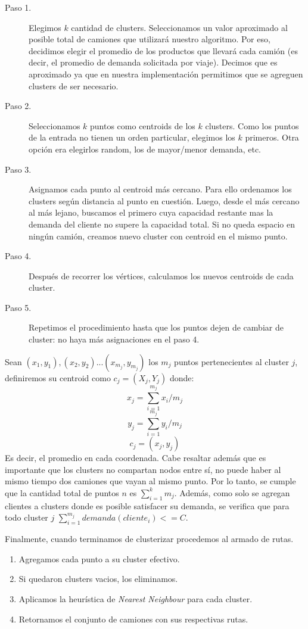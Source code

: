 \begin{description}
	\item[Paso 1.] Elegimos $k$ cantidad de clusters. Seleccionamos un valor aproximado al posible total de camiones que utilizará nuestro algoritmo. Por eso, decidimos elegir el promedio de los productos que llevará cada camión (es decir, el promedio de demanda solicitada por viaje). Decimos que es aproximado ya que en nuestra implementación permitimos que se agreguen clusters de ser necesario.
	\item[Paso 2.] Seleccionamos $k$ puntos como centroids de los $k$ clusters. Como los puntos de la entrada no tienen un orden particular, elegimos los $k$ primeros. Otra opción era elegirlos random, los de mayor/menor demanda, etc.
	\item[Paso 3.] Asignamos cada punto al centroid más cercano. Para ello ordenamos los clusters según distancia al punto en cuestión. Luego, desde el más cercano al más lejano, buscamos el primero cuya capacidad restante mas la demanda del cliente no supere la capacidad total. Si no queda espacio en ningún camión, creamos nuevo cluster con centroid en el mismo punto.
	\item[Paso 4.] Después de recorrer los vértices, calculamos los nuevos centroids de cada cluster.
	\item[Paso 5.] Repetimos el procedimiento hasta que los puntos dejen de cambiar de cluster: no haya más asignaciones en el paso 4.
\end{description}
Sean $(x_{1}, y_{1}), (x_{2}, y_{2})...(x_{m_{j}}, y_{m_{j}})$ los $m_{j}$ puntos pertenecientes al cluster $j$, definiremos su centroid como $c_{j}=(X_{j}, Y_{j})$ donde: \\
$$ x_{j} = \sum_{i=1}^{m_{j}} x_{i}/m_{j}$$
$$ y_{j} = \sum_{i=1}^{m_{j}} y_{i}/m_{j}$$
$$ c_{j}=(x_{j}, y_{j}) $$
Es decir, el promedio en cada coordenada. Cabe resaltar además que es importante que los clusters no compartan nodos entre sí, no puede haber al mismo tiempo dos camiones que vayan al mismo punto. Por lo tanto, se cumple que la cantidad total de puntos $n$ es $\sum_{i=1}^{k} m_{j}$. Además, como solo se agregan clientes a clusters donde es posible satisfacer su demanda, se verifica que para todo cluster $j$ $\sum_{i=1}^{m_{j}} demanda(cliente_{i}) <= C$.
\\
\par Finalmente, cuando terminamos de clusterizar procedemos al armado de rutas.
\begin{enumerate}
	\item Agregamos cada punto a su cluster efectivo.
	\item Si quedaron clusters vacios, los eliminamos.
	\item Aplicamos la heurística de \textit{Nearest Neighbour} para cada cluster.
	\item Retornamos el conjunto de camiones con sus respectivas rutas.
\end{enumerate}


